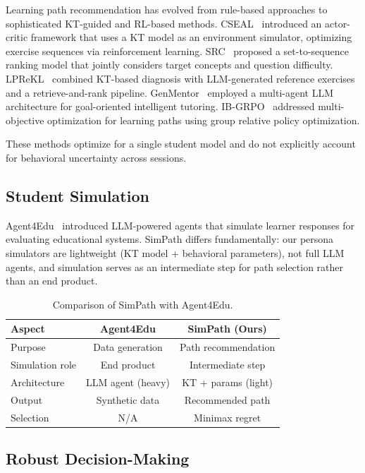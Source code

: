\documentclass[runningheads]{llncs}
\begin{document}
Learning path recommendation has evolved from rule-based approaches to sophisticated KT-guided and RL-based methods.
CSEAL~\cite{cseal2019} introduced an actor-critic framework that uses a KT model as an environment simulator, optimizing exercise sequences via reinforcement learning.
SRC~\cite{src2023} proposed a set-to-sequence ranking model that jointly considers target concepts and question difficulty.
LPReKL~\cite{lprekl2025} combined KT-based diagnosis with LLM-generated reference exercises and a retrieve-and-rank pipeline.
GenMentor~\cite{genmentor2025} employed a multi-agent LLM architecture for goal-oriented intelligent tutoring.
IB-GRPO~\cite{ibgrpo2026} addressed multi-objective optimization for learning paths using group relative policy optimization.

These methods optimize for a single student model and do not explicitly account for behavioral uncertainty across sessions.

\subsection{Student Simulation}

Agent4Edu~\cite{agent4edu2025} introduced LLM-powered agents that simulate learner responses for evaluating educational systems.
SimPath differs fundamentally: our persona simulators are lightweight (KT model + behavioral parameters), not full LLM agents, and simulation serves as an intermediate step for path selection rather than an end product.

\begin{table}[t]
\centering
\caption{Comparison of SimPath with Agent4Edu.}
\label{tab:comparison}
\begin{tabular}{lcc}
\toprule
\textbf{Aspect} & \textbf{Agent4Edu} & \textbf{SimPath (Ours)} \\
\midrule
Purpose & Data generation & Path recommendation \\
Simulation role & End product & Intermediate step \\
Architecture & LLM agent (heavy) & KT + params (light) \\
Output & Synthetic data & Recommended path \\
Selection & N/A & Minimax regret \\
\bottomrule
\end{tabular}
\end{table}

\subsection{Robust Decision-Making}
\end{document}
